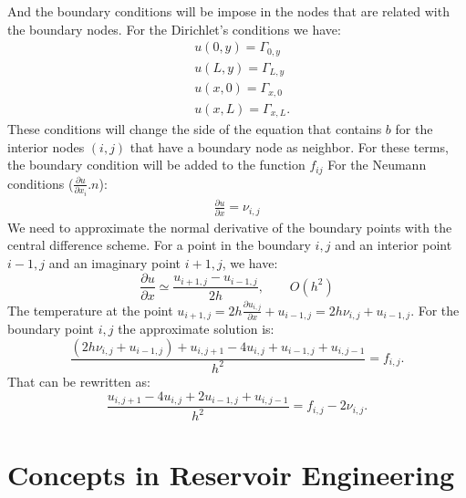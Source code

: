 \documentclass[a4paper,10pt]{report}
\begin{document}
And the boundary conditions will be impose in the nodes that are related with the boundary nodes.
For the Dirichlet's conditions we have:
\begin{align*}
&u(0,y)=\Gamma_{0,y}\\
&u(L,y)=\Gamma_{L,y}\\
&u(x,0)=\Gamma_{x,0}\\
&u(x,L)=\Gamma_{x,L}.
\end{align*}
These conditions will change the side of the equation that contains $b$ for the interior nodes $(i,j)$ that have a boundary node as neighbor.
For these terms, the boundary condition will be added to the function $f_{ij}$
For the Neumann conditions ($\frac{\partial u}{\partial x_i}. n$):
\begin{align*}
\frac{\partial u}{\partial x}=\nu_{i,j}
\end{align*}
We need to approximate the normal derivative of the boundary points with the central difference scheme. For a point
in the boundary $i,j$ and an interior point $i-1,j$ and an imaginary point $i+1,j$, we have:
\begin{equation*}
\frac{\partial u}{\partial x}\simeq\frac{u_{i+1,j}-u_{i-1,j}}{2h},\qquad O(h^2)
\end{equation*}
The temperature at the point $u_{i+1,j}=2h\frac{\partial u_{i,j}}{\partial x}+u_{i-1,j}=2h\nu_{i,j}+u_{i-1,j}$. 
For the boundary point $i,j$ the approximate solution is:
\begin{equation*}
\frac{(2h\nu_{i,j}+u_{i-1,j})+u_{i,j+1}-4u_{i,j}+u_{i-1,j}+u_{i,j-1}}{h^2}=f_{i,j}.
\end{equation*}
That can be rewritten as:
\begin{equation*}
\frac{u_{i,j+1}-4u_{i,j}+2u_{i-1,j}+u_{i,j-1}}{h^2}=f_{i,j}-2\nu_{i,j}.
\end{equation*}


\chapter{Concepts in Reservoir Engineering}
\end{document}

